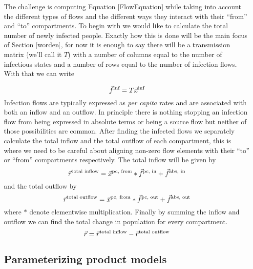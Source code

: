 The challenge is computing Equation \ref{FlowEquation} while taking into account the different types of flows and the different ways they interact with their ``from'' and ``to'' compartments. To begin with we would like to calculate the total number of newly infected people. Exactly how this is done will be the main focus of Section \ref{worden}, for now it is enough to say there will be a transmission matrix (we'll call it $T$) with a number of columns equal to the number of infectious states and a number of rows equal to the number of infection flows. With that we can write
    
\begin{equation}\label{infectionequation}
\vec{f}^\text{inf} = T\vec{x}^\text{inf}
\end{equation}
Infection flows are typically expressed as \emph{per capita} rates and are associated with both an inflow and an outflow. In principle there is nothing stopping an infection flow from being expressed in absolute terms or being a source flow but neither of those possibilities are common. After finding the infected flows we separately calculate the total inflow and the total outflow of each compartment, this is where we need to be careful about aligning non-zero flow elements with their ``to'' or ``from'' compartments respectively. The total inflow will be given by
\[
    \vec{r}^\text{total inflow} = \vec{x}^\text{pc, from} * \vec{f}^\text{pc, in} + \vec{f}^\text{abs, in}
\]
and the total outflow by     
\[
    \vec{r}^\text{total outflow} = \vec{x}^\text{pc, from} * \vec{f}^\text{pc, out} + \vec{f}^\text{abs, out}
\]
where $*$ denote elementwise multiplication. Finally by summing the inflow and outflow we can find the total change in population for every compartment.
\[
\vec{r} = \vec{r}^\text{total inflow} - \vec{r}^\text{total outflow}
\]     

\subsection{Parameterizing product models}

